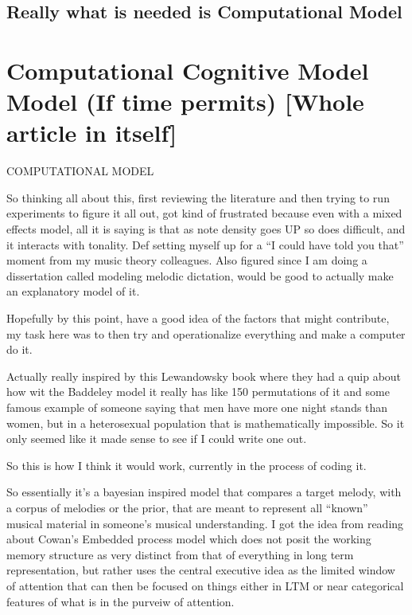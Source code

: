 \documentclass[]{book}
\theoremstyle{definition}
\theoremstyle{definition}
\theoremstyle{definition}
\theoremstyle{remark}
\begin{document}
\hypertarget{really-what-is-needed-is-computational-model}{%
\subsection{Really what is needed is Computational
Model}\label{really-what-is-needed-is-computational-model}}

\hypertarget{computational-cognitive-model-model-if-time-permits-whole-article-in-itself}{%
\section{Computational Cognitive Model Model (If time permits) {[}Whole
article in
itself{]}}\label{computational-cognitive-model-model-if-time-permits-whole-article-in-itself}}

COMPUTATIONAL MODEL

So thinking all about this, first reviewing the literature and then
trying to run experiments to figure it all out, got kind of frustrated
because even with a mixed effects model, all it is saying is that as
note density goes UP so does difficult, and it interacts with tonality.
Def setting myself up for a ``I could have told you that'' moment from
my music theory colleagues. Also figured since I am doing a dissertation
called modeling melodic dictation, would be good to actually make an
explanatory model of it.

Hopefully by this point, have a good idea of the factors that might
contribute, my task here was to then try and operationalize everything
and make a computer do it.

Actually really inspired by this Lewandowsky book where they had a quip
about how wit the Baddeley model it really has like 150 permutations of
it and some famous example of someone saying that men have more one
night stands than women, but in a heterosexual population that is
mathematically impossible. So it only seemed like it made sense to see
if I could write one out.

So this is how I think it would work, currently in the process of coding
it.

So essentially it's a bayesian inspired model that compares a target
melody, with a corpus of melodies or the prior, that are meant to
represent all ``known'' musical material in someone's musical
understanding. I got the idea from reading about Cowan's Embedded
process model which does not posit the working memory structure as very
distinct from that of everything in long term representation, but rather
uses the central executive idea as the limited window of attention that
can then be focused on things either in LTM or near categorical features
of what is in the purveiw of attention.
\end{document}
